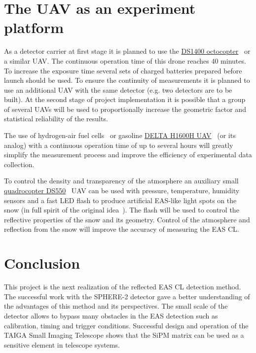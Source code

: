 \documentclass[a4paper,11pt]{article}
\begin{document}
\section{The UAV as an experiment platform}

As a detector carrier at first stage it is planned to use the \href{https://dronestroy.ru/catalog/copters/oktokopter-ds1400/}{DS1400 octocopter}~\cite{dronestroy} or a similar UAV.
The continuous operation time of this drone reaches 40 minutes.
To increase the exposure time several sets of charged batteries prepared before launch should be used. 
To ensure the continuity of measurements it is planned to use an additional UAV with the same detector (e.g. two detectors are to be built).
At the second stage of project implementation it is possible that a group of several UAVs will be used to proportionally increase the geometric factor and statistical reliability of the results. 

The use of hydrogen-air fuel cells~\cite{UAVair} or gasoline \href{http://r7dron.ru/}{DELTA H1600H UAV}~\cite{UAVoil} (or its analog) with a continuous operation time of up to several hours will greatly simplify the measurement process and improve the efficiency of experimental data collection.

To control the density and transparency of the atmosphere an auxiliary small \href{https://dronestroy.ru/catalog/copters/kvadrokopter-ds550/}{quadrocopter DS550}~\cite{dronestroy} UAV can be used with pressure, temperature, humidity sensors and a fast LED flash to produce artificial EAS-like light spots on the snow (in full spirit of the original idea~\cite{Chu74}).
The flash will be used to control the reflective properties of the snow and its geometry. Control of the atmosphere and reflection from the snow will improve the accuracy of measuring the EAS CL.

\section{Conclusion}

This project is the next realization of the reflected EAS CL detection method. The successful work with the SPHERE-2 detector gave a better understanding of the advantages of this method and its perspectives. The small scale of the detector allows to bypass many obstacles in the EAS detection such as calibration, timing and trigger conditions. Successful design and operation of the TAIGA Small Imaging Telescope shows that the SiPM matrix can be used as a sensitive element in telescope systems.
\end{document}
